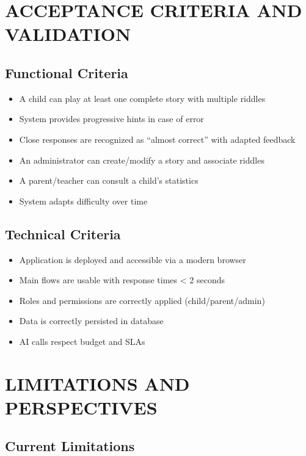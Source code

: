 \documentclass[12pt,a4paper]{article}
\begin{document}
\newpage

\section{ACCEPTANCE CRITERIA AND VALIDATION}

\subsection{Functional Criteria}

\begin{itemize}
    \item A child can play at least one complete story with multiple riddles
    \item System provides progressive hints in case of error
    \item Close responses are recognized as ``almost correct'' with adapted feedback
    \item An administrator can create/modify a story and associate riddles
    \item A parent/teacher can consult a child's statistics
    \item System adapts difficulty over time
\end{itemize}

\subsection{Technical Criteria}

\begin{itemize}
    \item Application is deployed and accessible via a modern browser
    \item Main flows are usable with response times < 2 seconds
    \item Roles and permissions are correctly applied (child/parent/admin)
    \item Data is correctly persisted in database
    \item AI calls respect budget and SLAs
\end{itemize}

\section{LIMITATIONS AND PERSPECTIVES}

\subsection{Current Limitations}
\end{document}
